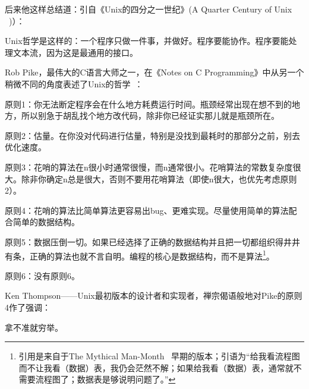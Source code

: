 \documentclass[12pt,oneside]{ctexbook}
\begin{document}
\begin{common-format}
后来他这样总结道：引自《Unix的四分之一世纪》(A Quarter Century of Unix ~\cite{Salus})）：

Unix哲学是这样的：一个程序只做一件事，并做好。程序要能协作。程序要能处理文本流，因为这是最通用的接口。

Rob Pike，最伟大的C语言大师之一，在《Notes on C  Programming》中从另一个稍微不同的角度表述了Unix的哲学~\cite{Pike}：

原则1：你无法断定程序会在什么地方耗费运行时间。瓶颈经常出现在想不到的地方，所以别急于胡乱找个地方改代码，除非你已经证实那儿就是瓶颈所在。

原则2：估量。在你没对代码进行估量，特别是没找到最耗时的那部分之前，别去优化速度。

原则3：花哨的算法在n很小时通常很慢，而n通常很小。花哨算法的常数复杂度很大。除非你确定n总是很大，否则不要用花哨算法（即使n很大，也优先考虑原则2）。

原则4：花哨的算法比简单算法更容易出bug、更难实现。尽量使用简单的算法配合简单的数据结构。

原则5：数据压倒一切。如果已经选择了正确的数据结构并且把一切都组织得井井有条，正确的算法也就不言自明。编程的核心是数据结构，而不是算法\footnote{引用是来自于The Mythical Man-Month ~\cite{Brooks}早期的版本；引语为“给我看流程图而不让我看（数据）表，我仍会茫然不解；如果给我看（数据）表，通常就不需要流程图了；数据表是够说明问题了。”}。

原则6：没有原则6。

Ken Thompson——Unix最初版本的设计者和实现者，禅宗偈语般地对Pike的原则4作了强调：

拿不准就穷举。


\end{common-format}
\end{document}
